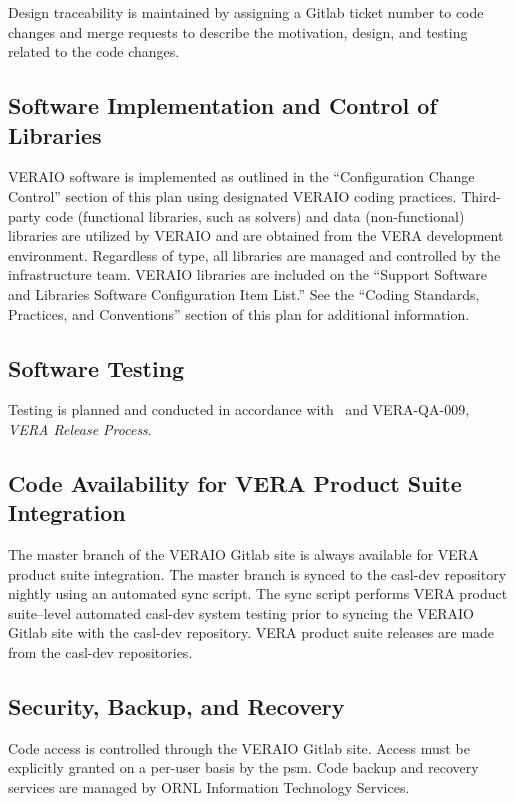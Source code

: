 \documentclass{vera-ornltm}
\begin{document}
Design traceability is maintained by assigning a Gitlab ticket number to code changes and merge requests to describe the motivation, design, and testing related to the code changes.

\subsection{Software Implementation and Control of Libraries}

VERAIO software is implemented as outlined in the ``Configuration Change Control'' section of this plan using designated VERAIO coding practices.
Third-party code (functional libraries, such as solvers) and data (non-functional) libraries are utilized by VERAIO and are obtained from the VERA development environment.
Regardless of type, all libraries are managed and controlled by the infrastructure team.
VERAIO libraries are included on the ``Support Software and Libraries Software Configuration Item List.''
See the ``Coding Standards, Practices, and Conventions'' section of this plan for additional information.

\subsection{Software Testing}

Testing is planned and conducted in accordance with \VERAReq\ and VERA-QA-009, {\it VERA Release Process}.

\subsection{Code Availability for VERA Product Suite Integration}

The master branch of the VERAIO Gitlab site is always available for VERA product suite integration.
The master branch is synced to the casl-dev repository nightly using an automated sync script.
The sync script performs VERA product suite--level automated casl-dev system testing prior to syncing the VERAIO Gitlab site with the casl-dev repository.
VERA product suite releases are made from the casl-dev repositories.

\subsection{Security, Backup, and Recovery}

Code access is controlled through the VERAIO Gitlab site.
Access must be explicitly granted on a per-user basis by the \ac{psm}.
Code backup and recovery services are managed by ORNL Information Technology Services.
\end{document}
